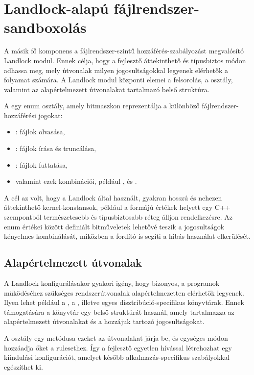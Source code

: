 \section{Landlock-alapú fájlrendszer-sandboxolás}

A másik fő komponens a fájlrendszer-szintű hozzáférés-szabályozást megvalósító
Landlock modul. Ennek célja, hogy a fejlesztő áttekinthető és típusbiztos módon
adhassa meg, mely útvonalak milyen jogosultságokkal legyenek elérhetők a
folyamat számára. A Landlock modul központi elemei a 
felsorolás, a  osztály, valamint az alapértelmezett
útvonalakat tartalmazó belső struktúra.

A  egy enum osztály, amely
bitmaszkon reprezentálja a különböző fájlrendszer-hozzáférési jogokat:

\begin{itemize}
  \item {}: fájlok olvasása,
  \item {}: fájlok írása és truncálása,
  \item {}: fájlok futtatása,
  \item valamint ezek kombinációi, például ,
   és .
\end{itemize}

A cél az volt, hogy a Landlock által használt, gyakran hosszú és nehezen
áttekinthető kernel-konstansok, például a
 formájú értékek helyett egy C++
szempontból természetesebb és típusbiztosabb réteg álljon rendelkezésre. Az enum
értékei között definiált bitműveletek lehetővé teszik a jogosultságok
kényelmes kombinálását, miközben a fordító is segíti a hibás használat
elkerülését.

\subsection{Alapértelmezett útvonalak}

A Landlock konfigurálásakor gyakori igény, hogy bizonyos, a programok
működéséhez szükséges rendszerútvonalak alapértelmezetten elérhetők legyenek.
Ilyen lehet például a , a , illetve egyes
disztribúció-specifikus könyvtárak. Ennek támogatására a könyvtár egy belső
struktúrát használ, amely
tartalmazza az alapértelmezett útvonalakat és a hozzájuk tartozó jogosultságokat.

A  osztály egy metódusa ezeket az
útvonalakat járja be, és egységes módon hozzáadja őket a rulesethez. Így a
fejlesztő egyetlen hívással létrehozhat egy kiindulási konfigurációt, amelyet
később alkalmazás-specifikus szabályokkal egészíthet ki.


